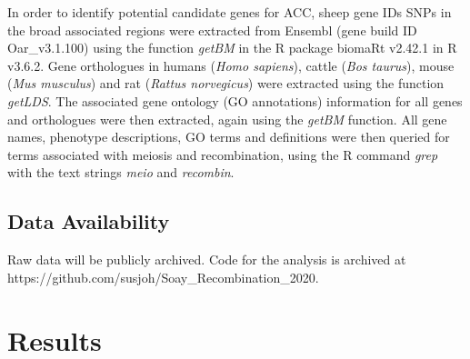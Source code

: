 \documentclass[a4paper,11pt]{article}
\begin{document}
In order to identify potential candidate genes for ACC, sheep gene IDs SNPs in the broad associated regions were extracted from Ensembl (gene build ID Oar\_v3.1.100) using the function \textit{getBM} in the R package biomaRt v2.42.1 \citep{Durinck2009} in R v3.6.2. Gene orthologues in humans (\textit{Homo sapiens}), cattle (\textit{Bos taurus}), mouse (\textit{Mus musculus}) and rat (\textit{Rattus norvegicus}) were extracted using the function \textit{getLDS}. The associated gene ontology (GO annotations) information for all genes and orthologues were then extracted, again using the \textit{getBM} function. All gene names, phenotype descriptions, GO terms and definitions were then queried for terms associated with meiosis and recombination, using the R command \textit{grep} with the text strings \textit{meio} and \textit{recombin}.

\subsection*{Data Availability}
Raw data will be publicly archived. Code for the analysis is archived at \\ https://github.com/susjoh/Soay\_Recombination\_2020.



\section*{Results}
\end{document}
